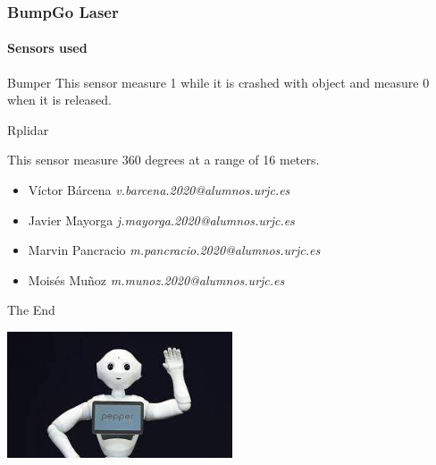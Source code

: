 \documentclass{beamer}
\begin{document}

\begin{frame}
\frametitle{BumpGo Laser}
\framesubtitle{Sensors used}

\begin{block}{Bumper}
	This sensor measure 1 while it is crashed with object and measure 0 when it is 			    released.

\end{block}

\begin{block}{Rplidar}
	
	This sensor measure 360 degrees at a range of 16 meters.
\end{block}

\end{frame}



\begin{frame}
\begin{itemize}
\frametitle{Contributors}
	\item Víctor Bárcena  \textit{v.barcena.2020@alumnos.urjc.es}
	\item Javier Mayorga    \textit{j.mayorga.2020@alumnos.urjc.es}
	\item Marvin Pancracio \textit{m.pancracio.2020@alumnos.urjc.es}
	\item Moisés Muñoz    \textit{m.munoz.2020@alumnos.urjc.es}
\end{itemize}
\end{frame}

\begin{frame}
\Huge{\centerline{The End}}

\centering
\includegraphics[width=0.5\textwidth]{p.jpeg}

\end{frame}

\end{document}
